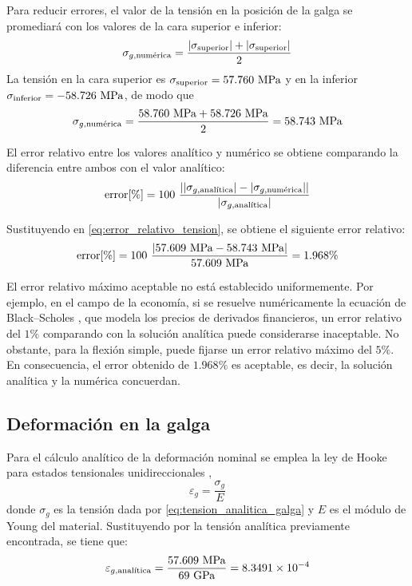 Para reducir errores, el valor de la tensión en la posición de la galga se promediará con los valores de la cara superior e inferior:
\begin{equation}
    \sigma_{g,\text{numérica}} = 
    \frac{\abs{\sigma_\text{superior}} + \abs{\sigma_\text{superior}}}{2}
\end{equation}
La tensión en la cara superior es $\sigma_\text{superior} = 57.760 \ \mega\pascal$ y en la inferior $\sigma_\text{inferior} = -58.726 \ \mega\pascal$, de modo que
\[
    \sigma_{g,\text{numérica}} = 
    \frac{58.760 \ \mega\pascal + 58.726 \ \mega\pascal}{2} = 58.743 \ \mega\pascal
\]

El error relativo entre los valores analítico y numérico se obtiene comparando la diferencia entre ambos con el valor analítico:
\begin{equation} \label{eq:error_relativo_tension}
    \text{error}[\%] = 
    100 \ 
    \frac{
    \abs{\abs{\sigma_{g,\text{analítica}}} - \abs{\sigma_{g,\text{numérica}}}}}{\abs{\sigma_{g,\text{analítica}}}}
\end{equation}

Sustituyendo en \eqref{eq:error_relativo_tension}, se obtiene el siguiente error relativo:
\[
    \text{error}[\%] = 
    100 \ 
    \frac{\abs{57.609 \ \mega\pascal - 58.743 \ \mega\pascal}}{57.609 \ \mega\pascal} = 
    1.968 \%
\]

El error relativo máximo aceptable no está establecido uniformemente. Por ejemplo, en el campo de la economía, si se resuelve numéricamente la ecuación de Black--Scholes \cite{salsa2016partial}, que modela los precios de derivados financieros, un error relativo del $1 \%$ comparando con la solución analítica puede considerarse inaceptable. No obstante, para la flexión simple, puede fijarse un error relativo máximo del $5 \%$. En consecuencia, el error obtenido de $1.968 \%$ es aceptable, es decir, la solución analítica y la numérica concuerdan.

\subsection{Deformación en la galga}

Para el cálculo analítico de la deformación nominal se emplea la ley de Hooke para estados tensionales unidireccionales \cite{manualPractica1},
\begin{equation}
    \varepsilon_g = \frac{\sigma_g}{E}
\end{equation}
donde $\sigma_g$ es la tensión dada por \eqref{eq:tension_analitica_galga} y $E$ es el módulo de Young del material. Sustituyendo por la tensión analítica previamente encontrada, se tiene que:
\[
    \varepsilon_{g,\text{analítica}} = 
    \frac{57.609 \ \mega\pascal}{69 \ \giga\pascal} = 
    8.3491 \times 10^{-4} 
\]


